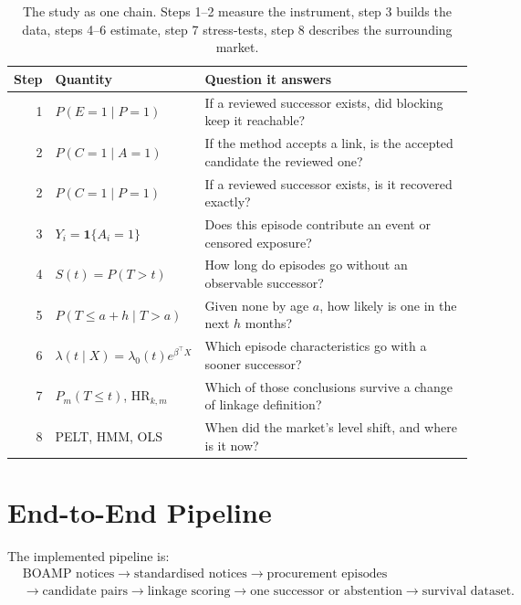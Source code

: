 \documentclass[11pt,a4paper]{article}
\begin{document}
\begin{table}[H]
\centering
\small
\begin{tabularx}{\textwidth}{rlX}
\toprule
Step & Quantity & Question it answers \\
\midrule
1 & \(P(E=1\mid P=1)\)          & If a reviewed successor exists, did blocking keep it reachable? \\
2 & \(P(C=1\mid A=1)\)          & If the method accepts a link, is the accepted candidate the reviewed one? \\
2 & \(P(C=1\mid P=1)\)          & If a reviewed successor exists, is it recovered exactly? \\
3 & \(Y_i=\mathbf{1}\{A_i=1\}\) & Does this episode contribute an event or censored exposure? \\
4 & \(S(t)=P(T>t)\)             & How long do episodes go without an observable successor? \\
5 & \(P(T\le a+h\mid T>a)\)     & Given none by age \(a\), how likely is one in the next \(h\) months? \\
6 & \(\lambda(t\mid X)=\lambda_0(t)e^{\beta^{\top}X}\) & Which episode characteristics go with a sooner successor? \\
7 & \(P_m(T\le t)\), \(\mathrm{HR}_{k,m}\) & Which of those conclusions survive a change of linkage definition? \\
8 & PELT, HMM, OLS              & When did the market's level shift, and where is it now? \\
\bottomrule
\end{tabularx}
\caption{The study as one chain. Steps 1--2 measure the instrument, step 3
builds the data, steps 4--6 estimate, step 7 stress-tests, step 8 describes the
surrounding market.}
\end{table}

\section{End-to-End Pipeline}
The implemented pipeline is:
\[
\begin{aligned}
&\text{BOAMP notices}
\rightarrow \text{standardised notices}
\rightarrow \text{procurement episodes} \\
&\rightarrow \text{candidate pairs}
\rightarrow \text{linkage scoring}
\rightarrow \text{one successor or abstention}
\rightarrow \text{survival dataset} .
\end{aligned}
\]
\end{document}
